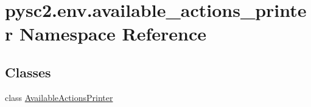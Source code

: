 \hypertarget{namespacepysc2_1_1env_1_1available__actions__printer}{}\section{pysc2.\+env.\+available\+\_\+actions\+\_\+printer Namespace Reference}
\label{namespacepysc2_1_1env_1_1available__actions__printer}
\subsection*{Classes}
\begin{DoxyCompactItemize}
\item 
class \mbox{\hyperlink{classpysc2_1_1env_1_1available__actions__printer_1_1_available_actions_printer}{Available\+Actions\+Printer}}
\end{DoxyCompactItemize}

